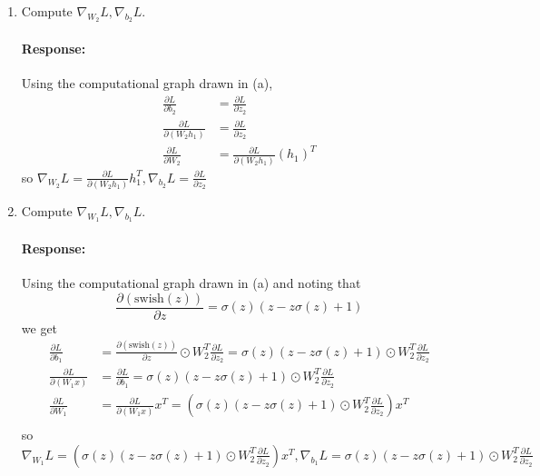 \documentclass{article}
\newcommand{\pd}[2]{\frac{\partial{#1}}{\partial{#2}}}
\newenvironment{response}{\begin{responseframe}\vspace{-10pt}\paragraph{Response:}}{\end{responseframe}}
\begin{document}
\begin{enumerate}
\begin{enumerate}
\begin{response}
                \end{response}
            \item Compute $\nabla_{W_2} L, \nabla_{b_2} L$.
                \begin{response}
                    Using the computational graph drawn in (a),
                    \begin{align*}
                        \pd{L}{b_2} &= \pd{L}{z_2} \\
                        \pd{L}{(W_2 h_1)} &= \pd{L}{z_2} \\
                        \pd{L}{W_2} &= \pd{L}{(W_2 h_1)} (h_1)^T
                    \end{align*}
                    so $\nabla_{W_2} L = \pd{L}{(W_2 h_1)} h_1^T, \nabla_{b_2} L = \pd{L}{z_2}$
                \end{response}
            \item Compute $\nabla_{W_1} L, \nabla_{b_1} L$.
                \begin{response}
                    Using the computational graph drawn in (a) and noting that
                    \[ \pd{(\text{swish}(z))}{z} = \sigma(z) (z - z \sigma(z) + 1) \]
                    we get
                    \begin{align*}
                        \pd{L}{b_1} &= \pd{(\text{swish}(z))}{z} \odot W_2^T \pd{L}{z_2}
                                    = \sigma(z) (z - z \sigma(z) + 1) \odot W_2^T \pd{L}{z_2} \\
                        \pd{L}{(W_1 x)} &= \pd{L}{b_1}
                                    = \sigma(z) (z - z \sigma(z) + 1) \odot W_2^T \pd{L}{z_2} \\
                        \pd{L}{W_1} &= \pd{L}{(W_1 x)} x^T
                                    = \left( \sigma(z) (z - z \sigma(z) + 1) \odot W_2^T \pd{L}{z_2}
                                        \right) x^T \\
                    \end{align*}
                    so 
                    $
                    \nabla_{W_1} L = \left( \sigma(z) (z - z \sigma(z) + 1) \odot W_2^T \pd{L}{z_2}
                                        \right) x^T,
                    \nabla_{b_1} L = \sigma(z) (z - z \sigma(z) + 1) \odot W_2^T \pd{L}{z_2}
                    $
                \end{response}
        \end{enumerate}
\end{enumerate}
\end{document}
